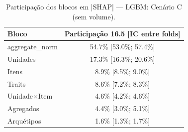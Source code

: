 \begin{table}[htbp]
\caption{Participação dos blocos em |SHAP| — LGBM: Cenário C (sem volume).}
\label{tab:blklgbm_C}
\centering
\small
\begin{tabular}{lc}
\toprule
Bloco & Participação 16.5 [IC entre folds] \\
\midrule
aggregate\_norm & 54.7\% [53.0\%; 57.4\%] \\
Unidades & 17.3\% [16.3\%; 20.6\%] \\
Itens & 8.9\% [8.5\%; 9.0\%] \\
Traits & 8.6\% [7.2\%; 8.3\%] \\
Unidade×Item & 4.6\% [4.2\%; 4.6\%] \\
Agregados & 4.4\% [3.0\%; 5.1\%] \\
Arquétipos & 1.6\% [1.3\%; 1.7\%] \\
\bottomrule
\end{tabular}
\end{table}
